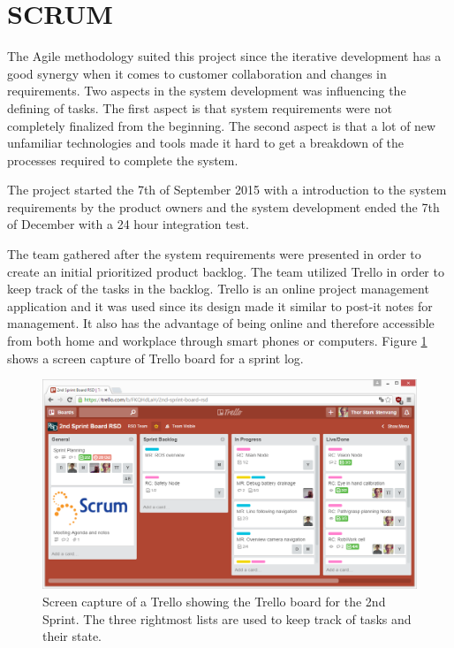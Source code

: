 \section{SCRUM \label{sec:scrum}}


The Agile methodology suited this project since the iterative development has a good synergy when it comes to customer collaboration and changes in requirements. Two aspects in the system development was influencing the defining of tasks. The first aspect is that system requirements were not completely finalized from the beginning. The second aspect is that a lot of new unfamiliar technologies and tools made it hard to get a breakdown of the processes required to complete the system.

The project started the 7th of September 2015 with a introduction to the system requirements by the product owners and the system development ended the 7th of December with a 24 hour integration test.

The team gathered after the system requirements were presented in order to create an initial prioritized product backlog. The team utilized Trello \citep{trello} in order to keep track of the tasks in the backlog. Trello is an online project management application and it was used since its design made it similar to post-it notes for management. It also has the advantage of being online and therefore accessible from both home and workplace through smart phones or computers. Figure \ref{fig:trello_cap} shows a screen capture of Trello board for a sprint log.
\begin{figure}[H]
	\centering
	\includegraphics[width=\textwidth]{figs/trello_example.png}
	\caption{Screen capture of a Trello showing the Trello board for the 2nd Sprint. The three rightmost lists are used to keep track of tasks and their state.}
	\label{fig:trello_cap}
\end{figure}

